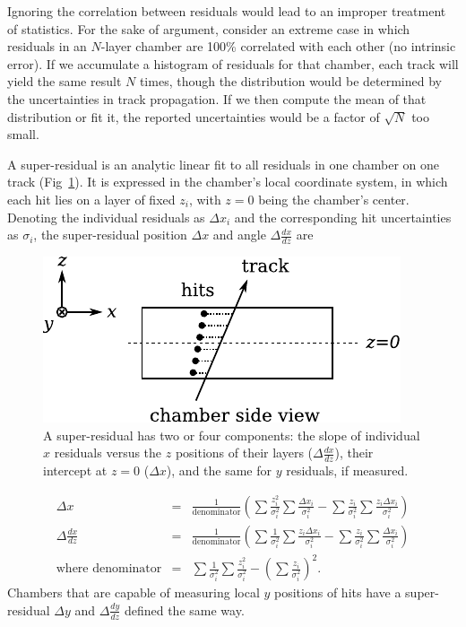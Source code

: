 \documentclass[12pt]{article}
\begin{document}
Ignoring the correlation between residuals would lead to an improper
treatment of statistics.  For the sake of argument, consider an
extreme case in which residuals in an $N$-layer chamber are 100\%
correlated with each other (no intrinsic error).  If we accumulate a
histogram of residuals for that chamber, each track will yield the
same result $N$ times, though the distribution would be determined by
the uncertainties in track propagation.  If we then compute the mean
of that distribution or fit it, the reported uncertainties would be a
factor of $\sqrt{N}$ too small.

A super-residual is an analytic linear fit to all residuals in one
chamber on one track (Fig~\ref{fig:superresidual0}).  It is expressed
in the chamber's local coordinate system, in which each hit lies on a
layer of fixed $z_i$, with $z=0$ being the chamber's center.  Denoting
the individual residuals as $\Delta x_i$ and the corresponding hit
uncertainties as $\sigma_i$, the super-residual position $\Delta x$
and angle $\Delta \frac{dx}{dz}$ are

\begin{figure}
\begin{center} \includegraphics{superresidual2.pdf} \end{center}
\caption{A super-residual has two or four components: the slope of individual $x$ residuals versus the $z$ positions of their layers ($\Delta \frac{dx}{dz}$), their intercept at $z=0$ ($\Delta x$), and the same for $y$ residuals, if measured. \label{fig:superresidual0}}
\end{figure}

\begin{eqnarray}
\Delta x &=& \frac{1}{\mbox{denominator}} \left(\sum\frac{z_i^2}{\sigma_i^2} \sum\frac{\Delta x_i}{\sigma_i^2} - \sum\frac{z_i}{\sigma_i^2} \sum\frac{z_i \Delta x_i}{\sigma_i^2}\right) \\
\Delta \frac{dx}{dz} &=& \frac{1}{\mbox{denominator}} \left(\sum\frac{1}{\sigma_i^2} \sum\frac{z_i \Delta x_i}{\sigma_i^2} - \sum\frac{z_i}{\sigma_i^2} \sum\frac{\Delta x_i}{\sigma_i^2}\right) \\
\mbox{where denominator} &=& \sum\frac{1}{\sigma_i^2} \sum\frac{z_i^2}{\sigma_i^2} - \left(\sum\frac{z_i}{\sigma_i^2}\right)^2\mbox{.}
\label{eqn:super-residual}
\end{eqnarray}
Chambers that are capable of measuring local $y$ positions of hits
have a super-residual $\Delta y$ and $\Delta \frac{dy}{dz}$ defined
the same way.
\end{document}
